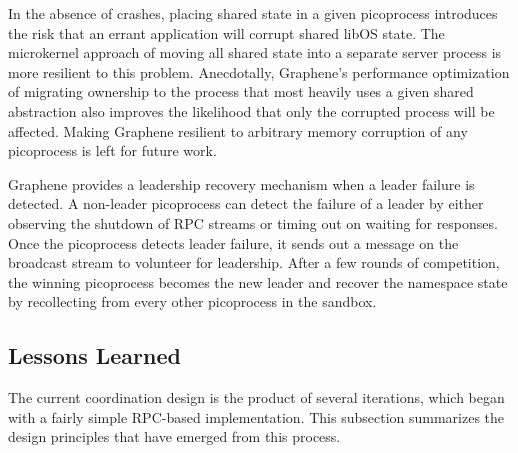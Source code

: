 In the absence of crashes, placing shared state in a given picoprocess introduces the risk that an errant 
application will corrupt shared libOS state.  The microkernel approach of 
moving all shared state into a separate server process is more resilient to this problem.
Anecdotally, Graphene's performance optimization of migrating ownership to the process that 
most heavily uses a given shared abstraction also improves the likelihood that only the corrupted
process will be affected.  
Making Graphene resilient to arbitrary memory corruption of any picoprocess is left for future work.

\vspace{5pt}
Graphene provides a leadership recovery mechanism when a leader failure is detected.
A non-leader picoprocess can detect the failure of a leader by either observing the shutdown of RPC streams or timing out on waiting for responses. 
Once the picoprocess detects leader failure, it sends out a message on the broadcast stream to volunteer for leadership.
After a few rounds of competition, the winning picoprocess becomes the new leader and recover the namespace state by recollecting from every other picoprocess in the sandbox.



\subsection{Lessons Learned}
\label{sec:namespaces:insights}

The current coordination design is the product of several iterations, which began 
with a fairly simple RPC-based implementation. %
This subsection summarizes the design principles that have emerged from this process.

